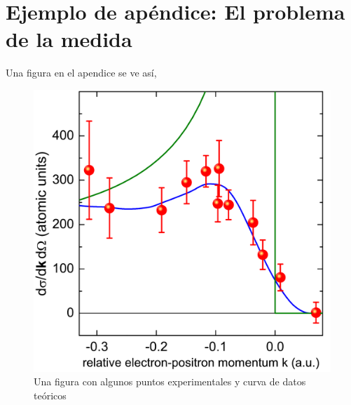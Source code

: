 \chapter{Ejemplo de ap\'{e}ndice: El problema de la medida}\label{C:ap1}
\graphicspath{{figs/}}
Una figura en el apendice se ve así,
\begin{figure}[ht]
\centering{}\includegraphics[width=\imsize]{ap1_f1}
\caption{Una figura con algunos puntos experimentales y curva de datos te\'{o}ricos\label{f:figura1}}  
\end{figure}

